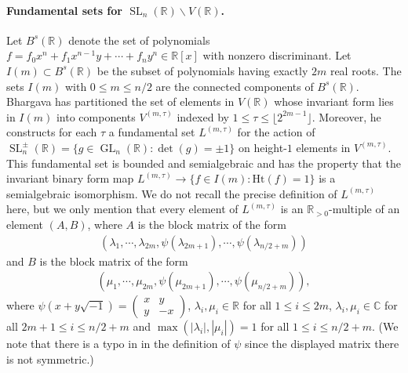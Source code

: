 \documentclass{article} %
\numberwithin{equation}{section}
\DeclareMathOperator{\GL}{GL}
\DeclareMathOperator{\SL}{SL}
\newcommand{\R}{\mathbb{R}}
\newcommand{\height}{\mathrm{Ht}}
\begin{document}
\paragraph{Fundamental sets for $\SL_n(\R)\backslash V(\R)$.}

Let $B^s(\R)$ denote the set of polynomials $f = f_0x^{n} +f_1x^{n-1}y + \cdots +f_ny^n \in \R[x]$ with nonzero discriminant. 
Let $I(m) \subset B^s(\R)$ be the subset of polynomials having exactly $2m$ real roots. 
The sets $I(m)$ with $0\leq m\leq n/2$ are the connected components of $B^s(\R)$.
Bhargava \cite[\S4.1.1]{bhargava2015mosthyperellipticarepointless} has partitioned the set of elements in $V(\R)$ whose invariant form lies in $I(m)$ into components $V^{(m,\tau)}$ indexed by $1\leq \tau \leq \lfloor 2^{2m-1}\rfloor$.
Moreover, he constructs for each $\tau$ a fundamental set $L^{(m,\tau)}$ for the action of $\SL_n^{\pm}(\R) = \{g\in \GL_n(\R) \colon \det(g) = \pm 1\}$ on height-$1$ elements in $V^{(m,\tau)}$.
This fundamental set is bounded and semialgebraic and has the property that the invariant binary form map $L^{(m,\tau)}\rightarrow \{ f\in I(m)\colon \height(f) =1 \}$ is a semialgebraic isomorphism.
We do not recall the precise definition of $L^{(m,\tau)}$ here, but we only mention that every element of $L^{(m,\tau)}$ is an $\R_{>0}$-multiple of an element $(A,B)$, where $A$ is the block matrix of the form
\begin{align}\label{eq1_fundset}
    \left(\lambda_1, \cdots , \lambda_{2m}, \psi(\lambda_{2m+1}), \cdots, \psi(\lambda_{n/2+m})\right)
\end{align}
and $B$ is the block matrix of the form 
\begin{align}\label{eq2_fundset}
    \left(\mu_1, \cdots , \mu_{2m}, \psi(\mu_{2m+1}), \cdots, \psi(\mu_{n/2+m})\right),
\end{align}
where $\psi(x+y\sqrt{-1}) = \begin{pmatrix}x & y \\ y& -x \end{pmatrix}$, $\lambda_i, \mu_i \in \R$ for all $1\leq i \leq 2m$, $\lambda_i, \mu_i\in \mathbb{C}$ for all $2m+1\leq i\leq n/2+m$ and $\max(|\lambda_i|, |\mu_i|) = 1$ for all $1\leq i \leq n/2+m$.
(We note that there is a typo in \cite[\S4.1.1]{bhargava2015mosthyperellipticarepointless} in the definition of $\psi$ since the displayed matrix there is not symmetric.)
\end{document}
